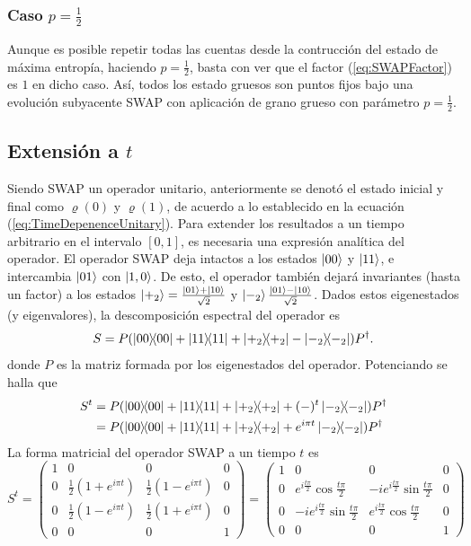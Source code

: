 \subsubsection{Caso $p=\frac{1}{2}$}

Aunque es posible repetir todas las cuentas desde la contrucción del estado de máxima entropía, haciendo $p=\frac{1}{2}$, basta con ver que el factor (\eqref{eq:SWAPFactor}) es $1$ en dicho caso. Así, todos los estado gruesos son puntos fijos bajo una evolución subyacente SWAP con aplicación de grano grueso con parámetro $p=\frac{1}{2}$.

\subsection{Extensión a $t$}
Siendo \textsc{SWAP} un operador unitario, anteriormente se denotó el estado inicial y final como $\varrho(0)$ y $\varrho(1)$, de acuerdo a lo establecido en la ecuación (\ref{eq:TimeDepenenceUnitary}). Para extender los resultados a un tiempo arbitrario en el intervalo $[0,1]$, es necesaria una expresión analítica del operador. El operador SWAP deja intactos a los estados $\ket{00}$ y $\ket{11}$, e intercambia $\ket{01}$ con $\ket{1,0}$. De esto, el operador también dejará invariantes (hasta un factor) a los estados $\ket{+_{2}}=\frac{\ket{01}+\ket{10}}{\sqrt{2}}$ y $\ket{-_{2}}\frac{\ket{01}-\ket{10}}{\sqrt{2}}$. Dados estos eigenestados (y eigenvalores), la descomposición espectral del operador es
\begin{equation}\label{eq:SWAPSpectral}
S=P(\dyad{00}+\dyad{11}+\dyad{+_{2}}-\dyad{-_{2}})P^{\dag}.
\end{equation}
donde $P$ es la matriz formada por los eigenestados del operador. Potenciando se halla que
\begin{align}\label{eq:SWAPPower}
S^{t}&=P(\dyad{00}+\dyad{11}+\dyad{+_{2}}+(-)^{t}\dyad{-_{2}})P^{\dag}\\
&=P(\dyad{00}+\dyad{11}+\dyad{+_{2}}+e^{i \pi t}\dyad{-_{2}})P^{\dag}
\end{align}
La forma matricial del operador \textsc{SWAP} a un tiempo $t$ es
\begin{equation}
S^{t}=\begin{pmatrix}
 1 & 0 & 0 & 0 \\
 0 & \frac{1}{2}(1+e^{i \pi t}) & \frac{1}{2} (1-e^{i \pi t}) & 0 \\
 0 & \frac{1}{2}(1-e^{i \pi t}) & \frac{1}{2}(1+e^{i \pi t}) & 0 \\
 0 & 0 & 0 & 1
\end{pmatrix}=\begin{pmatrix}
  1 & 0 & 0 & 0 \\
  0 & e^{i\frac{t\pi}{2}}\cos{\frac{t\pi}{2}} & -ie^{i\frac{t\pi}{2}}\sin{\frac{t\pi}{2}} & 0 \\
  0 & -ie^{i\frac{t\pi}{2}}\sin{\frac{t\pi}{2}} & e^{i\frac{t\pi}{2}}\cos{\frac{t\pi}{2}}  & 0 \\
  0 & 0 & 0 & 1
 \end{pmatrix}
\end{equation}

